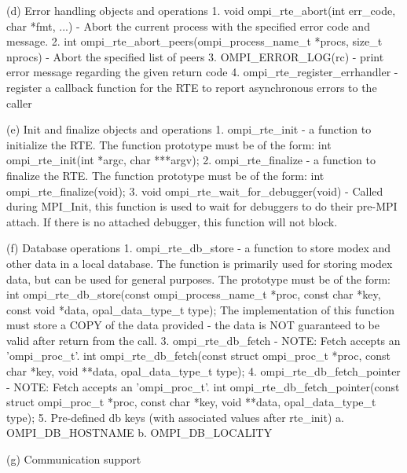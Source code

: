  (d) Error handling objects and operations
     1. void ompi_rte_abort(int err_code, char *fmt, ...) - Abort the current
        process with the specified error code and message.
     2. int ompi_rte_abort_peers(ompi_process_name_t *procs, size_t nprocs) -
        Abort the specified list of peers
     3. OMPI_ERROR_LOG(rc) - print error message regarding the given return code
     4. ompi_rte_register_errhandler - register a callback function for the RTE
        to report asynchronous errors to the caller

 (e) Init and finalize objects and operations
     1. ompi_rte_init - a function to initialize the RTE. The function
        prototype must be of the form:
        int ompi_rte_init(int *argc, char ***argv);
     2. ompi_rte_finalize - a function to finalize the RTE. The function
        prototype must be of the form:
        int ompi_rte_finalize(void);
     3. void ompi_rte_wait_for_debugger(void) - Called during MPI_Init, this
        function is used to wait for debuggers to do their pre-MPI attach.
        If there is no attached debugger, this function will not block.

 (f) Database operations
     1. ompi_rte_db_store - a function to store modex and other data in
        a local database. The function is primarily used for storing modex
        data, but can be used for general purposes. The prototype must be
        of the form:
        int ompi_rte_db_store(const ompi_process_name_t *proc,
                              const char *key, const void *data,
                              opal_data_type_t type);
        The implementation of this function must store a COPY of the data
        provided - the data is NOT guaranteed to be valid after return
        from the call.
     3. ompi_rte_db_fetch -
        NOTE: Fetch accepts an 'ompi_proc_t'.
        int ompi_rte_db_fetch(const struct ompi_proc_t *proc,
                              const char *key,
                              void **data,
                              opal_data_type_t type);
     4. ompi_rte_db_fetch_pointer -
        NOTE: Fetch accepts an 'ompi_proc_t'.
        int ompi_rte_db_fetch_pointer(const struct ompi_proc_t *proc,
                                      const char *key,
                                      void **data,
                                      opal_data_type_t type);
     5. Pre-defined db keys (with associated values after rte_init)
        a. OMPI_DB_HOSTNAME
        b. OMPI_DB_LOCALITY

  (g) Communication support


